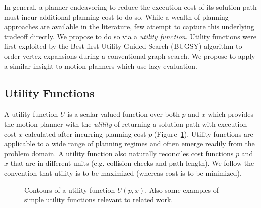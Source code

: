 In general,
a planner endeavoring to reduce the execution cost of its solution path
must incur additional planning cost to do so.
While a wealth of planning approaches are available in the literature,
few attempt to capture this underlying tradeoff directly.
We propose to do so via a \emph{utility function}.
Utility functions were first exploited by the
Best-first Utility-Guided Search (BUGSY) algorithm
\citep{ruml2007bugsy,burns2013bugsy}
to order vertex expansions during a
conventional graph search.
We propose to apply a similar insight to motion planners
which use lazy evaluation.

\subsection{Utility Functions}
\label{subsec:utility-functions}

A utility function $U$ is a scalar-valued function
over both $p$ and $x$
which provides the motion planner with
the \emph{utility} of returning a
solution path with execution cost $x$ calculated after
incurring planning cost $p$
(Figure~\ref{fig:utility-contours}).
Utility functions are applicable to a wide range of planning regimes
and often emerge readily from the problem domain.
A utility function also naturally reconciles cost functions
$p$ and $x$ that are in different units
(e.g. collision checks and path length).
We follow the convention that utility is to be maximized
(whereas cost is to be minimized).

\begin{figure}
   \centering
   \quad%
   
   \quad%
   \quad%
   \caption{Contours of a utility function $U(p,x)$.
      Also some examples of simple utility functions
      relevant to related work.}
   \label{fig:utility-contours}
\end{figure}

